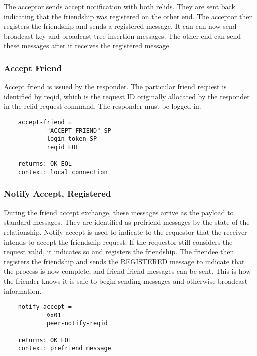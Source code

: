\documentclass[letterpaper,11pt,oneside]{article}
\begin{document}
The acceptor sends accept notification with both relids. They are sent back
indicating that the friendship was registered on the other end. The acceptor
then registers the friendship and sends a registered message. It can can now
send broadcast key and broadcast tree insertion messages. The other end can
send these messages after it receives the registered message.

\subsubsection{Accept Friend}

Accept friend is issued by the responder. The particular friend request is
identified by reqid, which is the request ID originally allocated by the
responder in the relid request command. The responder must be logged in.

\vspace{10pt}
\begin{verbatim}
    accept-friend =
            "ACCEPT_FRIEND" SP
            login_token SP
            reqid EOL

    returns: OK EOL
    context: local connection
\end{verbatim}
\vspace{10pt}


\subsubsection{Notify Accept, Registered}

During the friend accept exchange, these messages arrive as the payload to
standard messages. They are identified as prefriend messages by the state of
the relationship. Notify accept is used to indicate to the requestor that the
receiver intends to accept the friendship request. If the requestor still
considers the request valid, it indicates so and registers the friendship. The
friendee then registers the friendship and sends the REGISTERED message to
indicate that the process is now complete, and friend-friend messages can be
sent. This is how the friender knows it is safe to begin sending messages and
otherwise broadcast information.

\vspace{10pt}
\begin{verbatim}
    notify-accept = 
            %x01 
            peer-notify-reqid

    returns: OK EOL
    context: prefriend message
\end{verbatim}
\vspace{10pt}
\end{document}
